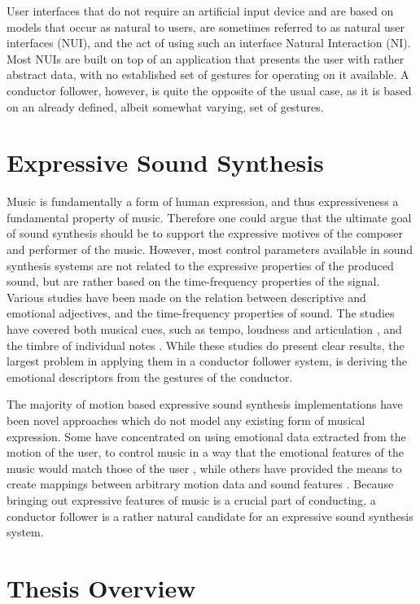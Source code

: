 User interfaces that do not require an artificial input device
and are based on models that occur as natural to users,
are sometimes referred to as natural user interfaces (NUI),
and the act of using such an interface Natural Interaction (NI).
Most NUIs are built on top of an application
that presents the user with rather abstract data,
with no established set of gestures for operating on it available.
A conductor follower, however,
is quite the opposite of the usual case,
as it is based on an already defined,
albeit somewhat varying, set of gestures.

\section{Expressive Sound Synthesis}

Music is fundamentally a form of human expression,
and thus expressiveness a fundamental property of music.
Therefore one could argue that the ultimate goal of sound synthesis should be to support
the expressive motives of the composer and performer of the music.
However, most control parameters available in sound synthesis systems
are not related to the expressive properties of the produced sound,
but are rather based on the time-frequency properties of the signal.
Various studies have been made on the relation between
descriptive and emotional adjectives,
and the time-frequency properties of sound.
The studies have covered both musical cues,
such as tempo, loudness and articulation \cite{juslin2000cue},
and the timbre of individual notes \cite{moravec2005}.
While these studies do present clear results,
the largest problem in applying them in a conductor follower system,
is deriving the emotional descriptors from the
gestures of the conductor. 

The majority of motion based expressive sound synthesis implementations
have been novel approaches which do not model any existing form of musical expression.
Some have concentrated on using emotional data
extracted from the motion of the user,
to control music in a way that the
emotional features of the music would match those of the user \cite{friberg2004},
while others have provided the means to create mappings
between arbitrary motion data and sound features \cite{kia2004}.
Because bringing out expressive features of music is a crucial part of conducting,
a conductor follower is a rather natural candidate for
an expressive sound synthesis system.

\section{Thesis Overview}

